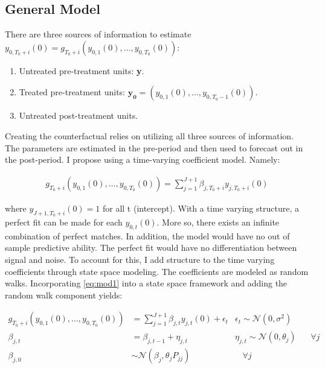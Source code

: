 \documentclass[
]{article}
\begin{document}
\hypertarget{general-model}{%
\subsection{General Model}\label{general-model}}

There are three sources of information to estimate
\(y_{0,T_0+i}(0)={g}_{T_0+i}\left(y_{0,1}(0),\dots,y_{0,T_0}(0)\right)\):

\begin{enumerate}
\def\labelenumi{\roman{enumi})}
\item
  Untreated pre-treatment units: \textbf{y}.
\item
  Treated pre-treatment units:
  \(\mathbf{y_0}=\left(y_{0,1}(0),\dots , y_{0,T_0-1}(0)\right)\).
\item
  Untreated post-treatment units.
\end{enumerate}

Creating the counterfactual relies on utilizing all three sources of
information. The parameters are estimated in the pre-period and then
used to forecast out in the post-period. I propose using a time-varying
coefficient model. Namely:

\begin{align}
g_{T_0+i}\left(y_{0,1}(0),\dots,y_{0,T_0}(0)\right)=\sum_{j=1}^{J+1}\beta_{j,T_0+i}y_{j,T_0+i}(0)
\label{eq:mod1}
\end{align}

where \(y_{J+1,T_0+i}(0)=1\) for all t (intercept). With a time varying
structure, a perfect fit can be made for each \(y_{0,t}(0)\). More so,
there exists an infinite combination of perfect matches. In addition,
the model would have no out of sample predictive ability. The perfect
fit would have no differentiation between signal and noise. To account
for this, I add structure to the time varying coefficients through state
space modeling. The coefficients are modeled as random walks.
Incorporating \eqref{eq:mod1} into a state space framework and adding
the random walk component yields:

\begin{align}
g_{T_0+i}\left(y_{0,1}(0),\dots,y_{0,T_0}(0)\right)&= \sum_{j=1}^{J+1} \beta_{j,t}y_{j,t}(0)+\epsilon_t & \epsilon_t \sim \mathcal{N}(0, \sigma^2) &\label{eq:rw1}\\
\beta_{j,t}&=\beta_{j,t-1}+\eta_{j,t} & \eta_{j,t} \sim \mathcal{N}(0,\theta_j) &\ \ \ \  \forall j \label{eq:rw}\\
\beta_{j,0}&\sim \mathcal{N}(\beta_j,\theta_j P_{jj}) &\ \ \ \ \forall j \label{eq:rw2}
\end{align}
\end{document}
